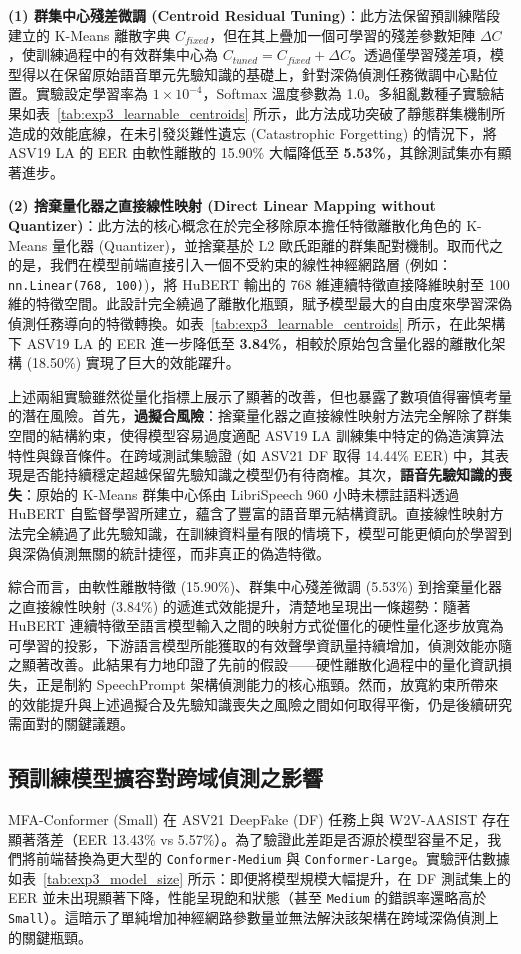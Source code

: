 \textbf{(1) 群集中心殘差微調 (Centroid Residual Tuning)}：此方法保留預訓練階段建立的 K-Means 離散字典 $C_{fixed}$，但在其上疊加一個可學習的殘差參數矩陣 $\Delta C$，使訓練過程中的有效群集中心為 $C_{tuned} = C_{fixed} + \Delta C$。透過僅學習殘差項，模型得以在保留原始語音單元先驗知識的基礎上，針對深偽偵測任務微調中心點位置。實驗設定學習率為 $1\times 10^{-4}$，Softmax 溫度參數為 1.0。多組亂數種子實驗結果如表~\ref{tab:exp3_learnable_centroids} 所示，此方法成功突破了靜態群集機制所造成的效能底線，在未引發災難性遺忘 (Catastrophic Forgetting) 的情況下，將 ASV19 LA 的 EER 由軟性離散的 15.90\% 大幅降低至 \textbf{5.53\%}，其餘測試集亦有顯著進步。

\textbf{(2) 捨棄量化器之直接線性映射 (Direct Linear Mapping without Quantizer)}：此方法的核心概念在於完全移除原本擔任特徵離散化角色的 K-Means 量化器 (Quantizer)，並捨棄基於 L2 歐氏距離的群集配對機制。取而代之的是，我們在模型前端直接引入一個不受約束的線性神經網路層 (例如：\texttt{nn.Linear(768, 100)})，將 HuBERT 輸出的 768 維連續特徵直接降維映射至 100 維的特徵空間。此設計完全繞過了離散化瓶頸，賦予模型最大的自由度來學習深偽偵測任務導向的特徵轉換。如表~\ref{tab:exp3_learnable_centroids} 所示，在此架構下 ASV19 LA 的 EER 進一步降低至 \textbf{3.84\%}，相較於原始包含量化器的離散化架構 (18.50\%) 實現了巨大的效能躍升。

上述兩組實驗雖然從量化指標上展示了顯著的改善，但也暴露了數項值得審慎考量的潛在風險。首先，\textbf{過擬合風險}：捨棄量化器之直接線性映射方法完全解除了群集空間的結構約束，使得模型容易過度適配 ASV19 LA 訓練集中特定的偽造演算法特性與錄音條件。在跨域測試集驗證 (如 ASV21 DF 取得 14.44\% EER) 中，其表現是否能持續穩定超越保留先驗知識之模型仍有待商榷。其次，\textbf{語音先驗知識的喪失}：原始的 K-Means 群集中心係由 LibriSpeech 960 小時未標註語料透過 HuBERT 自監督學習所建立，蘊含了豐富的語音單元結構資訊。直接線性映射方法完全繞過了此先驗知識，在訓練資料量有限的情境下，模型可能更傾向於學習到與深偽偵測無關的統計捷徑，而非真正的偽造特徵。

綜合而言，由軟性離散特徵 (15.90\%)、群集中心殘差微調 (5.53\%) 到捨棄量化器之直接線性映射 (3.84\%) 的遞進式效能提升，清楚地呈現出一條趨勢：隨著 HuBERT 連續特徵至語言模型輸入之間的映射方式從僵化的硬性量化逐步放寬為可學習的投影，下游語言模型所能獲取的有效聲學資訊量持續增加，偵測效能亦隨之顯著改善。此結果有力地印證了先前的假設——硬性離散化過程中的量化資訊損失，正是制約 SpeechPrompt 架構偵測能力的核心瓶頸。然而，放寬約束所帶來的效能提升與上述過擬合及先驗知識喪失之風險之間如何取得平衡，仍是後續研究需面對的關鍵議題。

\subsection{預訓練模型擴容對跨域偵測之影響}
\label{subsec:model_size_scaling}
MFA-Conformer (Small) 在 ASV21 DeepFake (DF) 任務上與 W2V-AASIST 存在顯著落差（EER 13.43\% vs 5.57\%）。為了驗證此差距是否源於模型容量不足，我們將前端替換為更大型的 \texttt{Conformer-Medium} 與 \texttt{Conformer-Large}。實驗評估數據如表~\ref{tab:exp3_model_size} 所示：即便將模型規模大幅提升，在 DF 測試集上的 EER 並未出現顯著下降，性能呈現飽和狀態（甚至 \texttt{Medium} 的錯誤率還略高於 \texttt{Small}）。這暗示了單純增加神經網路參數量並無法解決該架構在跨域深偽偵測上的關鍵瓶頸。

